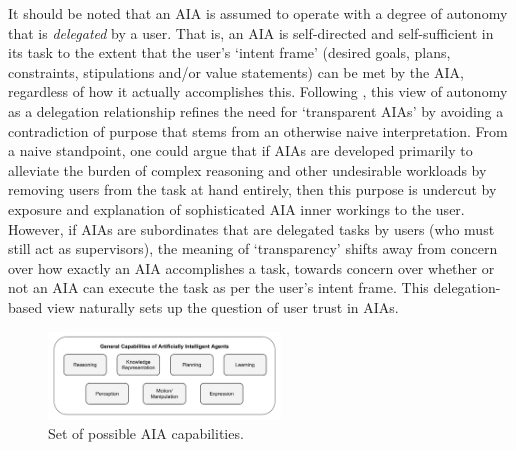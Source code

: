     It should be noted that an AIA is assumed to operate with a degree of autonomy that is \emph{delegated} by a user. That is, an AIA is self-directed and self-sufficient in its task to the extent that the user's `intent frame' (desired goals, plans, constraints, stipulations and/or value statements) can be met by the AIA, regardless of how it actually accomplishes this. %
    Following \citet{Miller2014-av}, this view of autonomy as a delegation relationship refines the need for `transparent AIAs' by avoiding a contradiction of purpose that stems from an otherwise naive interpretation. From a naive standpoint, one could argue that if AIAs are developed primarily to alleviate the burden of complex reasoning and other undesirable workloads by removing users from the task at hand entirely, then this purpose is undercut by exposure and explanation of sophisticated AIA inner workings to the user. 
    However, if AIAs are subordinates that are delegated tasks by users (who must still act as supervisors), the meaning of `transparency' shifts away from concern over how exactly an AIA accomplishes a task, towards concern over whether or not an AIA can execute the task as per the user's intent frame. 
    This delegation-based view naturally sets up the question of user trust in AIAs. 

	\begin{figure}[t!]%
    	\centering
     	\includegraphics[width=0.55\textwidth]{Figures/AI_capabilities}
    	\caption{Set of possible AIA capabilities.}
        \label{fig:AIcapabilities}
    \end{figure}

